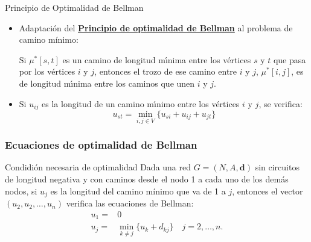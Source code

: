 \documentclass[aspectratio=169]{beamer}
\newcommand{\V}[1]{\mathbf{#1}}
\newcommand{\vd}{\V{d}}
\begin{document}
\begin{frame}{Principio de Optimalidad de Bellman}
\begin{itemize}\itemsep 4mm
	\item Adaptación del \underline{{\bf Principio de optimalidad de Bellman}} al problema de camino mínimo:
	\begin{center}
	\begin{minipage}{0.8\textwidth}
Si $\mu^*[s, t]$ es un camino de longitud m\'{\i}nima entre los v\'{e}rtices $s$ y $t$ que pasa por los v\'{e}rtices $i$ y $j$, entonces el trozo de ese camino entre $i$ y $j$, $\mu^*[i, j]$, es de longitud m\'{\i}nima entre los caminos que
unen $i$ y $j$.	
\end{minipage}
\end{center}
	\item Si $u_{ij}$ es la longitud de un camino m\'{\i}nimo entre los v\'{e}rtices $i$ y $j$, se verifica:
	$$u_{st} = \min_{i,j \in V} \{ u_{si}+u_{ij}+u_{jt} \}$$
%	
\end{itemize}
	

\end{frame}


\begin{frame}
	\frametitle{Ecuaciones de optimalidad de Bellman}
	
\begin{block}{Condidión necesaria de optimalidad}
		Dada una red $G=(N,A,\vd)$ sin circuitos de longitud negativa y con caminos desde el nodo 1 a cada uno de los
		dem\'as nodos, si $u_j$ es la longitud del camino m\'inimo que va de 1 a $j$, entonces el vector $(u_2,u_2,\dots,u_n)$  verifica las ecuaciones de Bellman:
		\begin{align*}
			u_1 = & 0 \\
			u_j = & \min_{k\neq j}\{u_k + d_{kj}\} \quad j=2,\ldots,n.
		\end{align*}	
	\end{block}
\end{frame}
\end{document}
